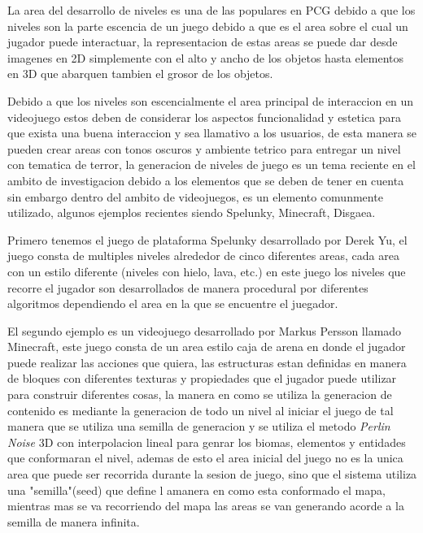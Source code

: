 La area del desarrollo de niveles es una de las populares en PCG debido a que
los niveles son la parte escencia de un juego debido a que es el area sobre el
cual un jugador puede interactuar, la representacion de estas areas se puede dar
desde imagenes en 2D simplemente con el alto y ancho de los objetos hasta
elementos en 3D que abarquen tambien el grosor de los objetos.

Debido a que los niveles son escencialmente el area principal de interaccion en
un videojuego estos deben de considerar los aspectos funcionalidad y estetica
para que exista una buena interaccion y sea llamativo a los usuarios, de esta
manera se pueden crear areas con tonos oscuros y ambiente tetrico para entregar
un nivel con tematica de terror, la generacion de niveles de juego es un tema
reciente en el ambito de investigacion debido a los elementos que se deben de
tener en cuenta sin embargo dentro del ambito de videojuegos, es un elemento
comunmente utilizado, algunos ejemplos recientes siendo Spelunky, Minecraft,
Disgaea.

Primero tenemos el juego de plataforma Spelunky desarrollado por Derek Yu, el
juego consta de multiples niveles alrededor de cinco diferentes areas, cada area
con un estilo diferente (niveles con hielo, lava, etc.) en este juego los niveles
que recorre el jugador son desarrollados de manera procedural por diferentes
algoritmos dependiendo el area en la que se encuentre el juegador.

El segundo ejemplo es un videojuego desarrollado por Markus Persson llamado
Minecraft, este juego consta de un area estilo caja de arena en donde el jugador
puede realizar las acciones que quiera, las estructuras estan definidas en
manera de bloques con diferentes texturas y propiedades que el jugador puede
utilizar para construir diferentes cosas, la manera en como se utiliza la
generacion de contenido es mediante la generacion de todo un nivel al iniciar el
juego de tal manera que se utiliza una semilla de generacion y se utiliza el
metodo \textit{Perlin Noise} 3D con interpolacion lineal para genrar los biomas,
elementos y entidades que conformaran el nivel, ademas de esto el area inicial
del juego no es la unica area que puede ser recorrida durante la sesion de
juego, sino que el sistema utiliza una "semilla"(seed) que define l amanera en
como esta conformado el mapa, mientras mas se va recorriendo del mapa las areas
se van generando acorde a la semilla de manera infinita.

